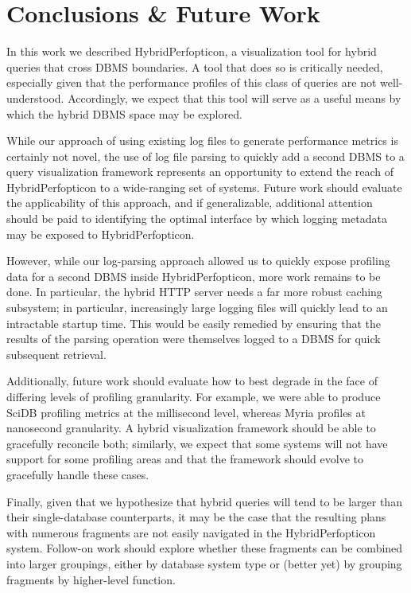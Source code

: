 \documentclass{chi2009}
\begin{document}

\section{Conclusions \& Future Work}

In this work we described HybridPerfopticon, a visualization tool for hybrid queries that cross DBMS boundaries.  A tool that does so is critically needed, especially given that the performance profiles of this class of queries are not well-understood.  Accordingly, we expect that this tool will serve as a useful means by which the hybrid DBMS space may be explored.

While our approach of using existing log files to generate performance metrics is certainly not novel, the use of log file parsing to quickly add a second DBMS to a query visualization framework represents an opportunity to extend the reach of HybridPerfopticon to a wide-ranging set of systems.  Future work should evaluate the applicability of this approach, and if generalizable, additional attention should be paid to identifying the optimal interface by which logging metadata may be exposed to HybridPerfopticon.

However, while our log-parsing approach allowed us to quickly expose profiling data for a second DBMS inside HybridPerfopticon, more work remains to be done.  In particular, the hybrid HTTP server needs a far more robust caching subsystem; in particular, increasingly large logging files will quickly lead to an intractable startup time.  This would be easily remedied by ensuring that the results of the parsing operation were themselves logged to a DBMS for quick subsequent retrieval.

Additionally, future work should evaluate how to best degrade in the face of differing levels of profiling granularity.  For example, we were able to produce SciDB profiling metrics at the millisecond level, whereas Myria profiles at nanosecond granularity.  A hybrid visualization framework should be able to gracefully reconcile both; similarly, we expect that some systems will not have support for some profiling areas and that the framework should evolve to gracefully handle these cases.

Finally, given that we hypothesize that hybrid queries will tend to be larger than their single-database counterparts, it may be the case that the resulting plans with numerous fragments are not easily navigated in the HybridPerfopticon system.  Follow-on work should explore whether these fragments can be combined into larger groupings, either by database system type or (better yet) by grouping fragments by higher-level function.



\end{document}
